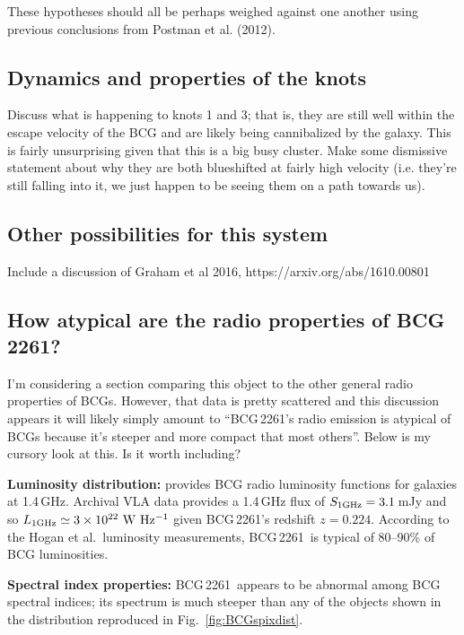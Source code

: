 \documentclass[useAMS,usenatbib]{emulateapj}
\newcommand{\src}{BCG\,2261}
\newcommand{\fixme}[1]{{\color{red} #1 }}
\begin{document}
These hypotheses should all be perhaps weighed against one another using previous conclusions from Postman et al. (2012).

\subsection{Dynamics and properties of the knots}
Discuss what is happening to knots 1 and 3; that is, they are still well within the escape velocity of the BCG and are likely being cannibalized by the galaxy. This is fairly unsurprising given that this is a big busy cluster. Make some dismissive statement about why they are both blueshifted at fairly high velocity (i.e. they're still falling into it, we just happen to be seeing them on a path towards us).

\subsection{Other possibilities for this system}
Include a discussion of Graham et al 2016, https://arxiv.org/abs/1610.00801

\subsection{How atypical are the radio properties of \src?}
\fixme{I'm considering a section comparing this object to the other general radio properties of BCGs. However, that data is pretty scattered and this discussion appears it will likely simply amount to ``\src's radio emission is atypical of BCGs because it's steeper and more compact that most others''. Below is my cursory look at this. Is it worth including?}

{\bf Luminosity distribution:} \citet{hogan+15} provides BCG radio luminosity functions for galaxies at 1.4\,GHz. Archival VLA data provides a 1.4\,GHz flux of \mbox{$S_{\rm 1GHz} = 3.1$}\,mJy and so \mbox{$L_{\rm 1GHz}\simeq3\times10^{22}~{\rm W~Hz^{-1}}$} given \src's redshift $z=0.224$. According to the Hogan et al.\ luminosity measurements, \src\ is typical of 80--90\% of BCG luminosities.

{\bf Spectral index properties:} \src\ appears to be abnormal among BCG spectral indices; its spectrum is much steeper than any of the objects shown in the distribution reproduced in Fig.\ \ref{fig:BCGspixdist}. 
\end{document}
